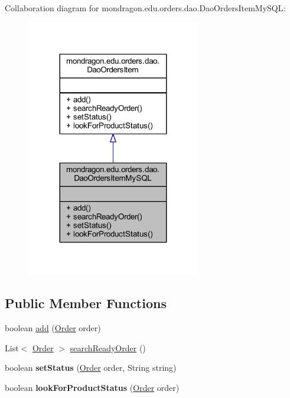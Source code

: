 Collaboration diagram for mondragon.\+edu.\+orders.\+dao.\+Dao\+Orders\+Item\+My\+S\+QL\+:\nopagebreak
\begin{figure}[H]
\begin{center}
\leavevmode
\includegraphics[width=215pt]{classmondragon_1_1edu_1_1orders_1_1dao_1_1_dao_orders_item_my_s_q_l__coll__graph}
\end{center}
\end{figure}
\subsection*{Public Member Functions}
\begin{DoxyCompactItemize}
\item 
boolean \mbox{\hyperlink{classmondragon_1_1edu_1_1orders_1_1dao_1_1_dao_orders_item_my_s_q_l_a3147aedbffd26a4549675f21a3f97785}{add}} (\mbox{\hyperlink{classmondragon_1_1edu_1_1clases_1_1_order}{Order}} order)
\item 
List$<$ \mbox{\hyperlink{classmondragon_1_1edu_1_1clases_1_1_order}{Order}} $>$ \mbox{\hyperlink{classmondragon_1_1edu_1_1orders_1_1dao_1_1_dao_orders_item_my_s_q_l_a52ac975587e6f3d4fd85f9ad42bdca5a}{search\+Ready\+Order}} ()
\item 
\mbox{\label{classmondragon_1_1edu_1_1orders_1_1dao_1_1_dao_orders_item_my_s_q_l_a0405f501412423f1ed1d89a86154989a}} 
boolean {\bfseries set\+Status} (\mbox{\hyperlink{classmondragon_1_1edu_1_1clases_1_1_order}{Order}} order, String string)
\item 
\mbox{\label{classmondragon_1_1edu_1_1orders_1_1dao_1_1_dao_orders_item_my_s_q_l_af53820ebf36b4f4071da640fb9630083}} 
boolean {\bfseries look\+For\+Product\+Status} (\mbox{\hyperlink{classmondragon_1_1edu_1_1clases_1_1_order}{Order}} order)
\end{DoxyCompactItemize}


